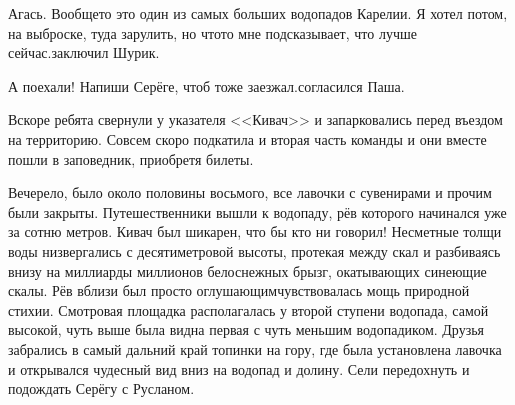 \diagdash Агась. Вообще\sdash то это один из самых больших водопадов Карелии. Я хотел потом, на выброске, туда зарулить, но что\sdash то мне подсказывает, что лучше сейчас.\mdash заключил Шурик.

\diagdash А поехали! Напиши Серёге, чтоб тоже заезжал.\mdash согласился Паша.

Вскоре ребята свернули у указателя <<Кивач>> и запарковались перед въездом на территорию. Совсем скоро подкатила и вторая часть команды и они вместе пошли в заповедник, приобретя билеты.

Вечерело, было около половины восьмого, все лавочки с сувенирами и прочим были закрыты. Путешественники вышли к водопаду, рёв которого начинался уже за сотню метров. Кивач был шикарен, что бы кто ни говорил! Несметные толщи воды низвергались с десятиметровой высоты, протекая между скал и разбиваясь внизу на миллиарды миллионов белоснежных брызг, окатывающих синеющие скалы. Рёв вблизи был просто оглушающим\mdash чувствовалась мощь природной стихии. Смотровая площадка располагалась у второй ступени водопада, самой высокой, чуть выше была видна первая с чуть меньшим водопадиком. Друзья забрались в самый дальний край топинки на гору, где была установлена лавочка и открывался чудесный вид вниз на водопад и долину. Сели передохнуть и подождать Серёгу с Русланом.



 






